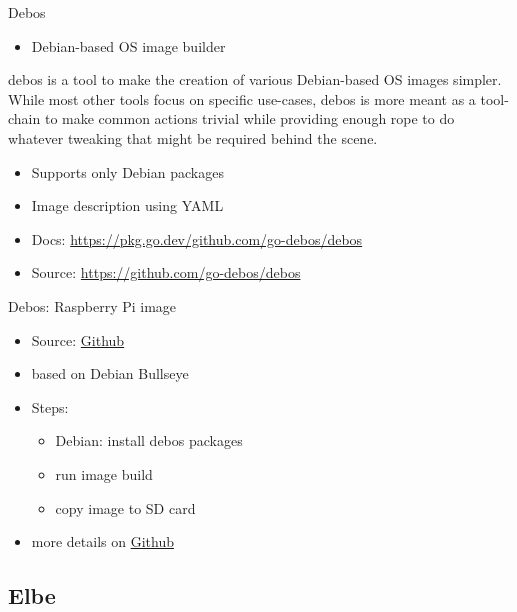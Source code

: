 \documentclass{beamer}
\begin{document}
\begin{frame}{Debos}
	\begin{itemize}
		\item Debian-based OS image builder
	\end{itemize}
	\begin{definition} 
		debos is a tool to make the creation of various Debian-based OS images simpler. While most other tools focus on specific use-cases, debos is more meant as a tool-chain to make common actions trivial while providing enough rope to do whatever tweaking that might be required behind the scene.
	\end{definition}
	\begin{itemize}
		\item Supports only Debian packages
		\item Image description using YAML
		\item Docs: \url{https://pkg.go.dev/github.com/go-debos/debos}
		\item Source: \url{https://github.com/go-debos/debos}
	\end{itemize}
\end{frame}

\begin{frame}{Debos: Raspberry Pi image}
	\begin{itemize}
		\item Source: \href{https://github.com/go-debos/debos-recipes/tree/main/rpi64}{Github}
		\item based on Debian Bullseye
		\item Steps:
		\begin{itemize}
			\item Debian: install debos packages
			\item run image build
			\item copy image to SD card
		\end{itemize}
		\item more details on \href{https://github.com/tomirgang/eh21_maintainable_linux/tree/main/examples/first_build_rpi4/debos}{Github}
	\end{itemize}
\end{frame}

\subsection{Elbe}
\end{document}
